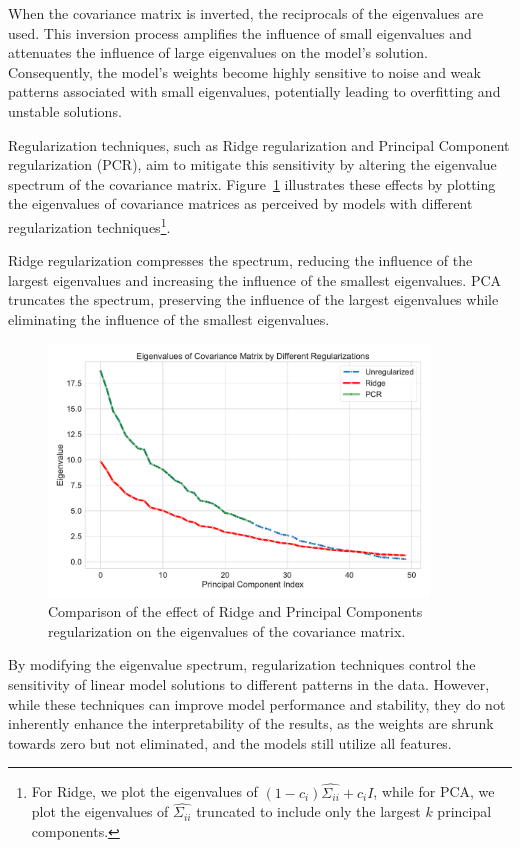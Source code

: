 When the covariance matrix is inverted, the reciprocals of the eigenvalues are used.
This inversion process amplifies the influence of small eigenvalues and attenuates the influence of large eigenvalues on the model's solution.
Consequently, the model's weights become highly sensitive to noise and weak patterns associated with small eigenvalues, potentially leading to overfitting and unstable solutions.

Regularization techniques, such as Ridge regularization and Principal Component regularization (PCR), aim to mitigate this sensitivity by altering the eigenvalue spectrum of the covariance matrix.
Figure~\ref{fig:shrinkage} illustrates these effects by plotting the eigenvalues of covariance matrices as perceived by models with different regularization techniques\footnote{For Ridge, we plot the eigenvalues of $(1 - c_i) \hat{\Sigma_{ii}} + c_i I$, while for PCA, we plot the eigenvalues of $\hat{\Sigma_{ii}}$ truncated to include only the largest $k$ principal components.}.

Ridge regularization compresses the spectrum, reducing the influence of the largest eigenvalues and increasing the influence of the smallest eigenvalues.
PCA truncates the spectrum, preserving the influence of the largest eigenvalues while eliminating the influence of the smallest eigenvalues.

\begin{figure}[h]
    \centering
    \includegraphics[width=0.9\textwidth]{figures/shrinkage/shrinkage}
    \caption{Comparison of the effect of Ridge and Principal Components regularization on the eigenvalues of the covariance matrix.}\label{fig:shrinkage}
\end{figure}

By modifying the eigenvalue spectrum, regularization techniques control the sensitivity of linear model solutions to different patterns in the data.
However, while these techniques can improve model performance and stability, they do not inherently enhance the interpretability of the results, as the weights are shrunk towards zero but not eliminated, and the models still utilize all features.

